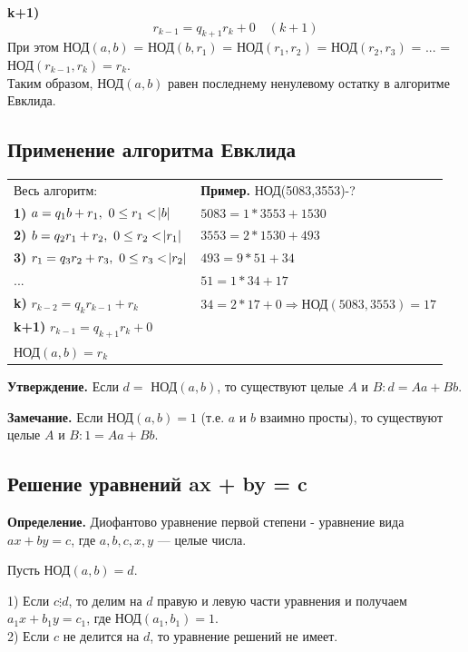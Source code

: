 \documentclass{article}
\begin{document}
            \textbf{k+1)} \[ r_{k-1} = q_{k+1}r_k + 0\quad (k+1) \]
            При этом НОД\( (a,b) \) = НОД\( (b,r_1) \) = НОД\( (r_1,r_2) \) = НОД\( (r_2,r_3) \) = ... = НОД\( (r_{k-1},r_k) = r_k \).\\
            Таким образом, НОД\( (a,b) \) равен последнему ненулевому остатку в алгоритме Евклида.

        \subsection{Применение алгоритма Евклида}
            \begin{tabular}{ll}
              Весь алгоритм: & \textbf{Пример.} НОД(5083,3553)-?\\
              \textbf{1)} \( a = q_1b + r_1,\ 0 \leq r_1 < \abs{b} \) & \( 5083 = 1*3553 + 1530 \)\\
              \textbf{2)} \( b = q_2r_1 + r_2,\ 0 \leq r_2 < \abs{r_1} \) & \( 3553 = 2*1530 + 493 \)\\
              \textbf{3)} \( r_1 = q_3r_2 + r_3,\ 0 \leq r_3 < \abs{r_2} \) & \( 493 = 9*51 + 34 \)\\
              ...& \( 51 = 1*34 + 17 \)\\
              \textbf{k)} \( r_{k-2} = q_kr_{k-1} + r_k \) & \( 34 = 2*17 + 0 \Rightarrow \textrm{НОД}(5083,3553) = 17\)\\
              \textbf{k+1)} \( r_{k-1} = q_{k+1}r_{k} + 0 \) & \\
              \( \textrm{НОД}(a,b) = r_k \) & \\
            \end{tabular}
			
            \textbf{Утверждение.} Если \( d = \textrm{ НОД}(a,b) \), то существуют целые \( A \) и \( B: d = Aa + Bb \).

    		\textbf{Замечание.} Если \( \textrm{НОД}(a,b) = 1 \) (т.е. \( a \) и \( b \) взаимно просты), то существуют целые \( A \) и \( B: 1 = Aa + Bb \).
        	
        \subsection{Решение уравнений ax + by = c}
        	\textbf{Определение.} Диофантово уравнение первой степени - уравнение вида \( ax + by = c \), где \( a,b,c,x,y \) --- целые числа.

            Пусть \( \textrm{НОД}(a,b) = d \).

            1) Если \( c \vdots d \), то делим на \( d \) правую и левую части уравнения и получаем \( a_1x + b_1y = c_1 \), где \( \textrm{НОД}(a_1, b_1) = 1 \).\\
            2) Если \( c \) не делится на \( d \), то уравнение решений не имеет.\\
\end{document}

